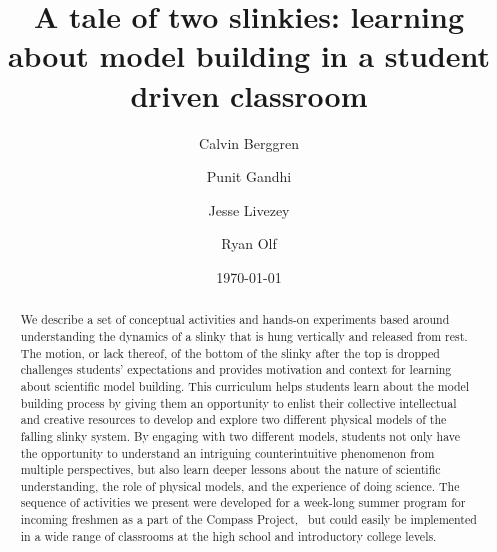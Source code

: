 \documentclass[prb,preprint]{revtex4-1}
\begin{document}
\title{A tale of two slinkies: learning about model building in a student driven classroom }
\author{Calvin Berggren}
\author{Punit  Gandhi}
\author{Jesse Livezey}
\author{Ryan Olf}
\date{\today}

\begin{abstract}

We describe a set of conceptual activities and hands-on experiments based around understanding the dynamics of a slinky that is hung vertically and released from rest.
The motion, or lack thereof, of the bottom of the slinky after the top is dropped challenges students' expectations and provides motivation and context for learning about scientific model building.
This curriculum helps students learn about the model building process by giving them an opportunity to enlist their collective intellectual and creative resources to develop and explore two different physical models of the falling slinky system. By engaging with two different models, students not only have the opportunity to understand an intriguing counterintuitive phenomenon from multiple perspectives, but also learn deeper lessons about the nature of scientific understanding, the role of physical models, and the experience of doing science. 
The sequence of activities we present were developed for a week-long summer program for incoming freshmen as a part of the Compass Project,~\cite{albana2013} but could easily be implemented in a wide range of classrooms at the high school and introductory college levels.
\end{abstract}

\maketitle
\end{document}
